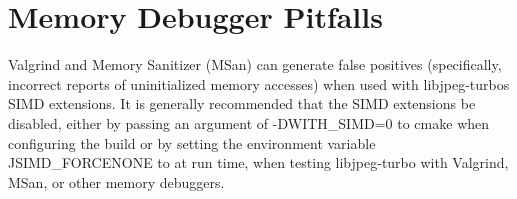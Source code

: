 \section*{Memory Debugger Pitfalls }

Valgrind and Memory Sanitizer (M\+San) can generate false positives (specifically, incorrect reports of uninitialized memory accesses) when used with libjpeg-\/turbo\textquotesingle{}s S\+I\+MD extensions. It is generally recommended that the S\+I\+MD extensions be disabled, either by passing an argument of {\ttfamily -\/\+D\+W\+I\+T\+H\+\_\+\+S\+I\+MD=0} to {\ttfamily cmake} when configuring the build or by setting the environment variable {\ttfamily J\+S\+I\+M\+D\+\_\+\+F\+O\+R\+C\+E\+N\+O\+NE} to {} at run time, when testing libjpeg-\/turbo with Valgrind, M\+San, or other memory debuggers. 